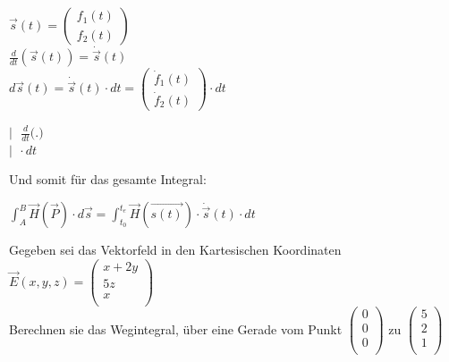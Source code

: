 \fboxsep=0pt
\begin{minipage}[t]{0.68\linewidth}

	\begin{flushright}
		$ \vec{s}(t) = \left(\begin{array}{c} f_1(t) \\ f_2(t)  \end{array}\right)$ \\
		\fspace
		$ \displaystyle \frac{d}{dt}(\vec{s}(t)) = \dot{\vec{s}}(t) $ \\
		\fspace
		$ \displaystyle d\vec{s}(t) = \dot{\vec{s}}(t) \cdot dt = \left(\begin{array}{c} \dot{f}_1(t) \\ \dot{f}_2(t)  \end{array}\right) \cdot dt	$
	\end{flushright}
\end{minipage}
\hfill%
\begin{minipage}[t]{0.28\linewidth}
	\begin{flushleft}
$ \displaystyle \big | \ \ \  \frac{d}{dt} \big ( . \big ) $ \\

\fspace
\fspace
\fspace
$\displaystyle  \big |\ \  \cdot dt$ \\

\end{flushleft}
\end{minipage}


\begin{center}

\end{center}



Und somit für das gesamte Integral: \\
\begin{center}
	$ \displaystyle \int_A^B \vec{H}(\vec{P})\cdot d\vec{s} = \int_{t_0}^{t_e} \vec{H}(\vec{s(t)})\cdot \dot{\vec{s}}(t) \cdot dt $
\end{center}
\iend


\beginbsp
Gegeben sei das Vektorfeld in den Kartesischen Koordinaten $\vec{E}(x,y,z) =  \left(\begin{array}{c} x + 2y \\ 5z\\ x\\ \end{array}\right) $ \\
Berechnen sie das Wegintegral, über eine Gerade vom Punkt $\left(\begin{array}{c} 0 \\ 0\\ 0\\ \end{array}\right)$ zu $\left(\begin{array}{c} 5 \\ 2\\ 1\\ \end{array}\right)$
\iend

